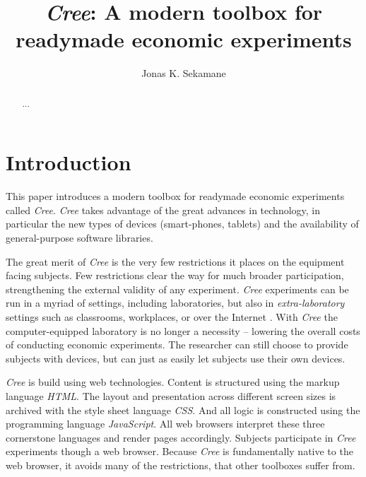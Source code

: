 \documentclass[preprint, 12pt]{elsarticle}
\newcommand{\Cree}{\emph{Cree}\xspace}
\begin{document}
\begin{frontmatter}

\title{\emph{Cree}: A modern toolbox for readymade economic experiments}
\author{Jonas K. Sekamane}
\address{{\color{red} First draft}}

\begin{abstract}
{\color{red} ...}
\end{abstract}

\end{frontmatter}


\section{Introduction}
\label{S:Introduction}

This paper introduces a modern toolbox for readymade economic experiments called \Cree. \Cree takes advantage of the great advances in technology, in particular the new types of devices (smart-phones, tablets) and the availability of general-purpose software libraries. 

The great merit of \Cree is the very few restrictions it places on the equipment facing subjects. Few restrictions clear the way for much broader participation, strengthening the external validity of any experiment. \Cree experiments can be run in a myriad of settings, including laboratories, but also in \emph{extra-laboratory} settings such as classrooms, workplaces, or over the Internet \citep{Charness_Gneezy_Kuhn_2013}. With \Cree the computer-equipped laboratory is no longer a necessity -- lowering the overall costs of conducting economic experiments. The researcher can still choose to provide subjects with devices, but can just as easily let subjects use their own devices. 

\Cree is build using web technologies. Content is structured using the markup language \emph{HTML}. The layout and presentation across different screen sizes is archived with the style sheet language \emph{CSS}. And all logic is constructed using the programming language \emph{JavaScript}. All web browsers interpret these three cornerstone languages and render pages accordingly. Subjects participate in \Cree experiments though a web browser. Because \Cree is fundamentally native to the web browser, it avoids many of the restrictions, that other toolboxes suffer from.
\end{document}
